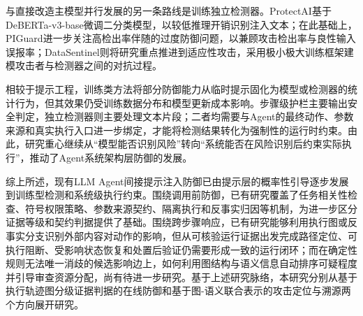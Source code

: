 与直接改造主模型并行发展的另一条路线是训练独立检测器。ProtectAI\cite{protectai2024deberta}基于DeBERTa-v3-base微调二分类模型，以较低推理开销识别注入文本；在此基础上，PIGuard\cite{li2025piguard}进一步关注高检出率伴随的过度防御问题，以兼顾攻击检出率与良性输入误报率；DataSentinel\cite{liu2025datasentinel}则将研究重点推进到适应性攻击，采用极小极大训练框架建模攻击者与检测器之间的对抗过程。

相较于提示工程，训练类方法将部分防御能力从临时提示固化为模型或检测器的统计行为，但其效果仍受训练数据分布和模型更新成本影响。步骤级护栏\cite{mou2026toolsafe}主要输出安全判定，独立检测器\cite{li2025piguard,liu2025datasentinel}则主要处理文本片段；二者均需要与Agent的最终动作、参数来源和真实执行入口进一步绑定，才能将检测结果转化为强制性的运行时约束。由此，研究重心继续从“模型能否识别风险”转向“系统能否在风险识别后约束实际执行”，推动了Agent系统架构层防御的发展。


综上所述，现有LLM Agent间接提示注入防御已由提示层的概率性引导逐步发展到训练型检测和系统级执行约束。围绕调用前防御，已有研究覆盖了任务相关性检查、符号权限策略、参数来源契约、隔离执行和反事实归因等机制，为进一步区分证据等级和契约判据提供了基础。围绕跨步骤响应，已有研究能够利用执行图或反事实分支识别外部内容对动作的影响，但从可核验运行证据出发完成路径定位、可执行阻断、受影响状态恢复和处置后验证仍需要形成一致的运行闭环；而在确定性规则无法唯一消歧的候选影响边上，如何利用图结构与语义信息自动排序可疑程度并引导审查资源分配，尚有待进一步研究。基于上述研究脉络，本研究分别从基于执行轨迹图分级证据判据的在线防御和基于图-语义联合表示的攻击定位与溯源两个方向展开研究。

